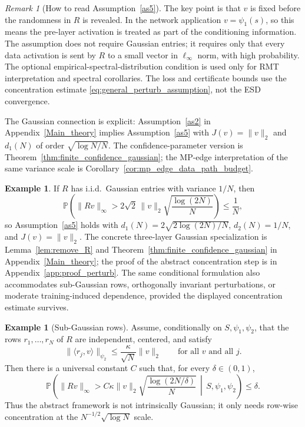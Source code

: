 \documentclass[11pt]{article}
\theoremstyle{plain}
\theoremstyle{definition}
\newtheorem{ex}[thm]{Example}
\theoremstyle{remark}
\newtheorem{rem}[thm]{Remark}
\newcommand{\PP}{\mathbb{P}}
\newcommand{\1}{\mathbf{1}}
\begin{document}
\begin{rem}[How to read Assumption~\ref{as5}]
The key point is that \(v\) is fixed before the randomness in \(R\) is revealed.  In the network application \(v=\psi_1(s)\), so this means the pre-layer activation is treated as part of the conditioning information.  The assumption does not require Gaussian entries; it requires only that every data activation is sent by \(R\) to a small vector in \(\ell_\infty\) norm, with high probability.  The optional empirical-spectral-distribution condition is used only for RMT interpretation and spectral corollaries.  The loss and certificate bounds use the concentration estimate \eqref{eq:general_perturb_assumption}, not the ESD convergence.

The Gaussian connection is explicit: Assumption~\ref{as2} in Appendix~\ref{Main_theory} implies Assumption~\ref{as5} with \(J(v)=\|v\|_2\) and \(d_1(N)\) of order \(\sqrt{\log N/N}\).  The confidence-parameter version is Theorem~\ref{thm:finite_confidence_gaussian}; the MP-edge interpretation of the same variance scale is Corollary~\ref{cor:mp_edge_data_path_budget}.
\end{rem}

\begin{ex}
If \(R\) has i.i.d.\ Gaussian entries with variance \(1/N\), then
\[
\PP\!\left(
\|Rv\|_\infty
>
2\sqrt{2}\,\|v\|_2\sqrt{\frac{\log(2N)}{N}}
\right)
\le
\frac{1}{N},
\]
so Assumption~\ref{as5} holds with \(d_1(N)=2\sqrt{2\log(2N)/N}\), \(d_2(N)=1/N\), and \(J(v)=\|v\|_2\). The concrete three-layer Gaussian specialization is Lemma~\ref{lem:remove_R} and Theorem~\ref{thm:finite_confidence_gaussian} in Appendix~\ref{Main_theory}; the proof of the abstract concentration step is in Appendix~\ref{app:proof_perturb}. The same conditional formulation also accommodates sub-Gaussian rows, orthogonally invariant perturbations, or moderate training-induced dependence, provided the displayed concentration estimate survives.
\end{ex}

\begin{ex}[Sub-Gaussian rows]
\label{ex:subgaussian_rows}
Assume, conditionally on \(S,\psi_1,\psi_2\), that the rows \(r_1,\dots,r_N\) of \(R\) are independent, centered, and satisfy
\[
\|\langle r_j,v\rangle\|_{\psi_2}
\le
\frac{\kappa}{\sqrt N}\|v\|_2
\qquad
\text{for all }v\text{ and all }j.
\]
Then there is a universal constant \(C\) such that, for every \(\delta\in(0,1)\),
\[
\PP\!\left(
\|Rv\|_\infty
>
C\kappa\|v\|_2\sqrt{\frac{\log(2N/\delta)}{N}}
\,\middle|\,S,\psi_1,\psi_2
\right)
\le \delta.
\]
Thus the abstract framework is not intrinsically Gaussian; it only needs row-wise concentration at the \(N^{-1/2}\sqrt{\log N}\) scale.
\end{ex}
\end{document}
